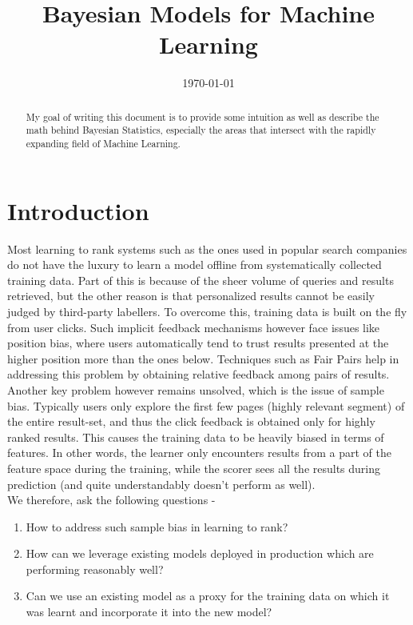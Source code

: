 \documentclass[a4paper]{article}
\title{Bayesian Models for Machine Learning}
\author{}
\date{\today}
\begin{document}
\maketitle

\begin{abstract}
\noindent My goal of writing this document is to provide some intuition as well as describe the math behind Bayesian Statistics, especially the areas that intersect with the rapidly expanding field of Machine Learning.
\end{abstract}

\section{Introduction}

\noindent Most learning to rank systems such as the ones used in popular search companies do not have the luxury to learn a model offline from systematically collected training data. Part of this is because of the sheer volume of queries and results retrieved, but the other reason is that personalized results cannot be easily judged by third-party labellers. To overcome this, training data is built on the fly from user clicks. Such implicit feedback mechanisms however face issues like position bias, where users automatically tend to trust results presented at the higher position more than the ones below. Techniques such as Fair Pairs \citep{radlinski2006minimally} help in addressing this problem by obtaining relative feedback among pairs of results. Another key problem however remains unsolved, which is the issue of sample bias. Typically users only explore the first few pages (highly relevant segment) of the entire result-set, and thus the click feedback is obtained only for highly ranked results. This causes the training data to be heavily biased in terms of features. In other words, the learner only encounters results from a part of the feature space during the training, while the scorer sees all the results during prediction (and quite understandably doesn’t perform as well). \\

\noindent We therefore, ask the following questions - 
\renewcommand{\labelenumi}{\alph{enumi})}
\begin{enumerate}
\item How to address such sample bias in learning to rank? 
\item How can we leverage existing models deployed in production which are performing reasonably well? 
\item Can we use an existing model as a proxy for the training data on which it was learnt and incorporate it into the new model?
\end{enumerate}
\end{document}

